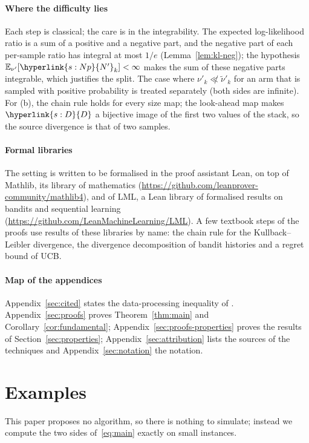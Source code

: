 \documentclass[11pt]{article}
\newcommand{\sy}[2]{\hyperlink{#1}{#2}}
\newcommand{\E}{\mathbb{E}}
\newcommand{\Np}{\sy{s:Np}{N'}}
\newcommand{\Dd}{\sy{s:D}{D}}
\begin{document}
\paragraph{Where the difficulty lies} Each step is classical; the care is in the integrability.
The expected log-likelihood ratio is a sum of a positive and a negative part, and the negative
part of each per-sample ratio has integral at most $1/e$ (Lemma~\ref{lem:kl-neg}); the hypothesis
$\E_{\nu'}[\Np_k]<\infty$ makes the sum of these negative parts integrable, which justifies the split.
The case where $\nu'_k\not\ll\tilde\nu'_k$ for an arm that is sampled with positive probability is
treated separately (both sides are infinite). For (b), the chain rule holds for every size map; the
look-ahead map makes $\Dd$ a bijective image of the first two values of the stack, so the source
divergence is that of two samples.

\paragraph{Formal libraries} The setting is written to be formalised in the proof assistant Lean, on
top of Mathlib, its library of mathematics (\url{https://github.com/leanprover-community/mathlib4}),
and of LML, a Lean library of formalised results on bandits and sequential learning
(\url{https://github.com/LeanMachineLearning/LML}). A few textbook steps of the proofs use results of
these libraries by name: the chain rule for the Kullback--Leibler divergence, the divergence
decomposition of bandit histories and a regret bound of UCB.

\paragraph{Map of the appendices} Appendix~\ref{sec:cited} states the data-processing inequality
of \citet{GMS19}. Appendix~\ref{sec:proofs} proves Theorem~\ref{thm:main} and
Corollary~\ref{cor:fundamental}; Appendix~\ref{sec:proofs-properties} proves the results of
Section~\ref{sec:properties}; Appendix~\ref{sec:attribution} lists the sources of the techniques
and Appendix~\ref{sec:notation} the notation.

\section{Examples}\label{sec:examples}

This paper proposes no algorithm, so there is nothing to simulate; instead we compute the two sides
of~\eqref{eq:main} exactly on small instances.
\end{document}
